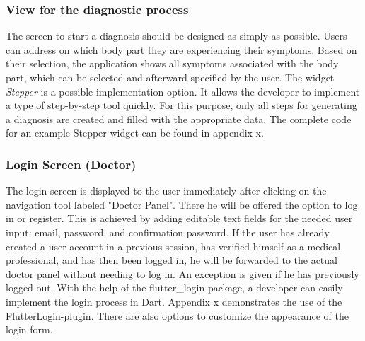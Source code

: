 \subsubsection{\textbf{View for the diagnostic process}}
The screen to start a diagnosis should be designed as simply as possible. Users can address on which body part they are experiencing their symptoms. Based on their selection, the application shows all symptoms associated with the body part, which can be selected and afterward specified by the user. The widget \textit{Stepper} is a possible implementation option. It allows the developer to implement a type of step-by-step tool quickly. For this purpose, only all steps for generating a diagnosis are created and filled with the appropriate data. The complete code for an example Stepper widget can be found in appendix x.

\subsubsection{\textbf{Login Screen (Doctor)}}
The login screen is displayed to the user immediately after clicking on the navigation tool labeled "Doctor Panel". There he will be offered the option to log in or register. This is achieved by adding editable text fields for the needed user input: email, password, and confirmation password. If the user has already created a user account in a previous session, has verified himself as a medical professional, and has then been logged in, he will be forwarded to the actual doctor panel without needing to log in. An exception is given if he has previously logged out. With the help of the flutter\_login package, a developer can easily implement the login process in Dart. Appendix x demonstrates the use of the FlutterLogin-plugin. There are also options to customize the appearance of the login form.

